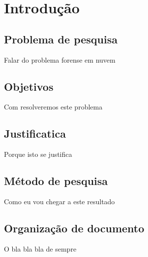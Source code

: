 \chapter{Introdução}

\section{Problema de pesquisa}

Falar do problema forense em nuvem

\section{Objetivos}

Com resolveremos este problema

\section{Justificatica}

Porque isto se justifica

\section{Método de pesquisa}

Como eu vou chegar a este resultado

\section{Organização de documento}

O bla bla bla de sempre